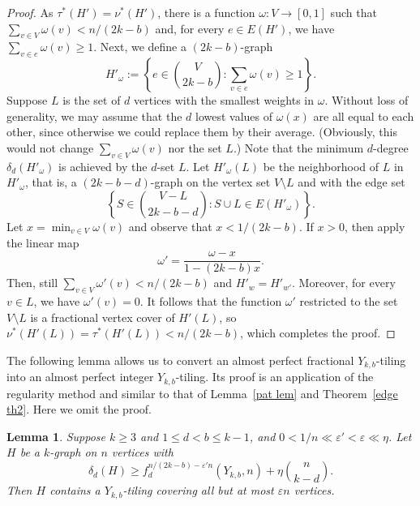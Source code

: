 \documentclass[11pt, reqno]{amsart}    	%
\newtheorem{lemma}[thm]{Lemma}
\theoremstyle{definition}
\numberwithin{equation}{section}
\begin{document}
\begin{proof}
		As $\tau^*(H') = \nu^*(H')$, there is a function $\omega: V \to [0,1]$ such that $\sum_{v\in V} \omega(v) < n/(2k-b)$ and, for every $e \in E(H')$, we have $\sum_{v\in e} \omega(v) \ge 1$. 
		Next, we define a $(2k-b)$-graph
		\[
		H'_{\omega} := \left \{e\in \binom{V}{2k-b}: \sum_{v\in e}\omega(v)\ge1 \right \}.
		\]
		Suppose $L$ is the set of $d$ vertices with the smallest weights in $\omega$. 
		Without loss of generality, we may assume that the $d$ lowest values of $\omega (x)$ are all equal to each other, since otherwise we could replace them by their average. (Obviously, this would not change $\sum_{v\in V} \omega(v)$ nor the set $L$.) 
		Note that the minimum $d$-degree $\delta_d(H'_{\omega})$ is achieved by the $d$-set $L$. 
		Let $H'_{\omega}(L)$ be the neighborhood of $L$ in $H'_{\omega}$, that is, a $(2k-b-d)$-graph on the vertex set $V \setminus L$ and with the edge set
		\[
		\left \{S \in \binom{V-L}{2k-b-d}: S\cup L\in E(H'_{\omega}) \right \}.
		\]
		Let $x = \min_{v\in V} \omega(v)$ and observe that $x < 1/(2k-b)$. 
		If $x > 0$, then apply the linear map
		\[
		\omega' = \frac{\omega-x}{1-(2k-b)x}. 
		\]
		Then, still $\sum_{v\in V} \omega'(v) < n/(2k-b)$ and $H'_w = H'_{w'}$.
		Moreover, for every $v\in L$, we have $\omega'(v) = 0$.
		It follows that the function $\omega'$ restricted to the set $V\setminus L$ is a fractional vertex cover of $H'(L)$, so $\nu^*(H'(L))=\tau^*(H'(L))<n/(2k-b)$, which completes the proof.
	\end{proof}
	
	The following lemma allows us to convert an almost perfect fractional $Y_{k,b}$-tiling into an almost perfect integer $Y_{k,b}$-tiling. Its proof is an application of the regularity method and similar to that of Lemma~\ref{pat lem} and Theorem~\ref{edge th2}.
	Here we omit the proof.
	\begin{lemma}\label{ftot}
		Suppose $k \ge 3$ and $1 \le d < b \le k-1$, and $ 0<1/n\ll\varepsilon'<\varepsilon\ll \eta $. Let $ H $ be a $ k $-graph on $ n $ vertices with
		\[
		\delta_{d}(H)\ge	f_d^{n/(2k-b)-\varepsilon'n}(Y_{k, b}, n) +\eta\binom{n}{k-d}.
		\] Then $ H $ contains a $Y_{k,b}$-tiling covering all but at most $\varepsilon n$ vertices.
	\end{lemma}
	
\end{document}
